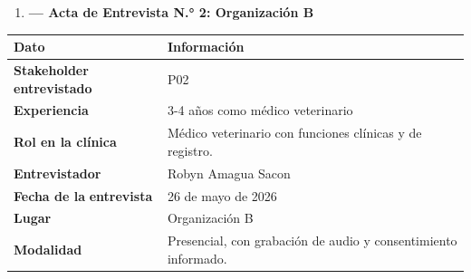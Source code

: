 \documentclass[
]{article}
\newcounter{none} %
\begin{document}
\begin{enumerate}
\def\labelenumi{\arabic{enumi}.}
\setcounter{enumi}{1}
\item
  \textbf{--- Acta de Entrevista N.° 2: Organización B}
\end{enumerate}

{\def\LTcaptype{none} %
\begin{longtable}[]{|
  >{\raggedright\arraybackslash}p{}|
  >{\raggedright\arraybackslash}p{}|}
\hline
\begin{minipage}[b]{\linewidth}\centering
\textbf{Dato}
\end{minipage} & \begin{minipage}[b]{\linewidth}\centering
\textbf{Información}
\end{minipage} \\
\hline
\endhead
\hline
\endlastfoot
\textbf{Stakeholder} \textbf{entrevistado} & \begin{minipage}[t]{\linewidth}\raggedright
P02
\end{minipage} \\
\hline
\textbf{Experiencia} & \begin{minipage}[t]{\linewidth}\raggedright
3-4 años como médico veterinario
\end{minipage} \\
\hline
\textbf{Rol en la clínica} & \begin{minipage}[t]{\linewidth}\raggedright
Médico veterinario con funciones clínicas y de registro.
\end{minipage} \\
\hline
\textbf{Entrevistador} & \begin{minipage}[t]{\linewidth}\raggedright
Robyn Amagua Sacon
\end{minipage} \\
\hline
\textbf{Fecha de la} \textbf{entrevista} & \begin{minipage}[t]{\linewidth}\raggedright
26 de mayo de 2026
\end{minipage} \\
\hline
\textbf{Lugar} & \begin{minipage}[t]{\linewidth}\raggedright
Organización B
\end{minipage} \\
\hline
\textbf{Modalidad} & \begin{minipage}[t]{\linewidth}\raggedright
Presencial, con grabación de audio y consentimiento informado.

\end{minipage}
\end{longtable}}
\end{document}
